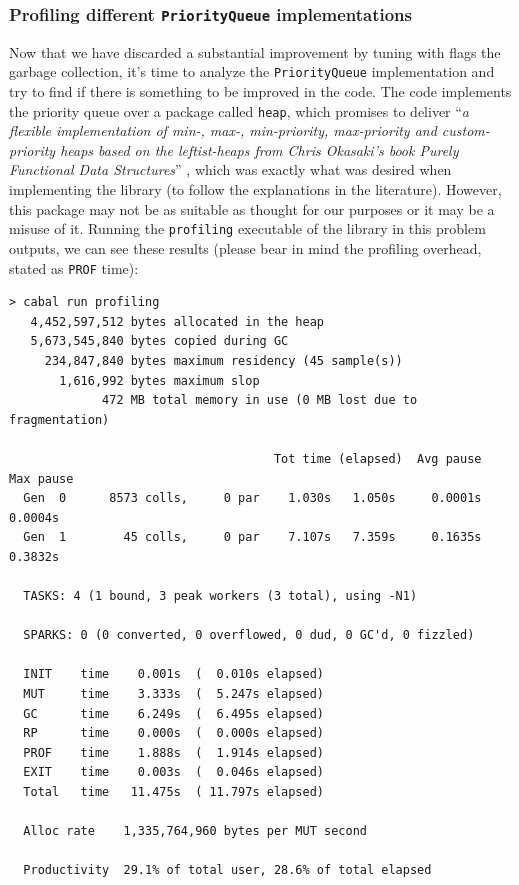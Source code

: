\subsubsection{Profiling different \texttt{PriorityQueue} implementations}

Now that we have discarded a substantial improvement by tuning with flags the
garbage collection, it's time to analyze the \texttt{PriorityQueue}
implementation and try to find if there is something to be improved in the
code. The code implements the priority queue over a package called
\texttt{heap}, which promises to deliver ``\textit{a flexible implementation of
  min-, max-, min-priority, max-priority and custom-priority heaps based on the
  leftist-heaps from Chris Okasaki's book Purely Functional Data Structures}''
\cite{okasaki-1999-purely}, which was exactly what was desired when
implementing the library (to follow the explanations in the literature).
However, this package may not be as suitable as thought for our purposes or it
may be a misuse of it. Running the \texttt{profiling} executable of the library
in this problem outputs, we can see these results (please bear in mind the
profiling overhead, stated as \texttt{PROF} time):\\

\begin{lstlisting}
> cabal run profiling
   4,452,597,512 bytes allocated in the heap
   5,673,545,840 bytes copied during GC
     234,847,840 bytes maximum residency (45 sample(s))
       1,616,992 bytes maximum slop
             472 MB total memory in use (0 MB lost due to fragmentation)

                                     Tot time (elapsed)  Avg pause  Max pause
  Gen  0      8573 colls,     0 par    1.030s   1.050s     0.0001s    0.0004s
  Gen  1        45 colls,     0 par    7.107s   7.359s     0.1635s    0.3832s

  TASKS: 4 (1 bound, 3 peak workers (3 total), using -N1)

  SPARKS: 0 (0 converted, 0 overflowed, 0 dud, 0 GC'd, 0 fizzled)

  INIT    time    0.001s  (  0.010s elapsed)
  MUT     time    3.333s  (  5.247s elapsed)
  GC      time    6.249s  (  6.495s elapsed)
  RP      time    0.000s  (  0.000s elapsed)
  PROF    time    1.888s  (  1.914s elapsed)
  EXIT    time    0.003s  (  0.046s elapsed)
  Total   time   11.475s  ( 11.797s elapsed)

  Alloc rate    1,335,764,960 bytes per MUT second

  Productivity  29.1% of total user, 28.6% of total elapsed
\end{lstlisting}


